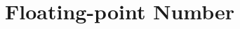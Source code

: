 \documentclass[../main.tex]{subfiles}
\begin{document}
    \section{Floating-point Number}
\end{document}
